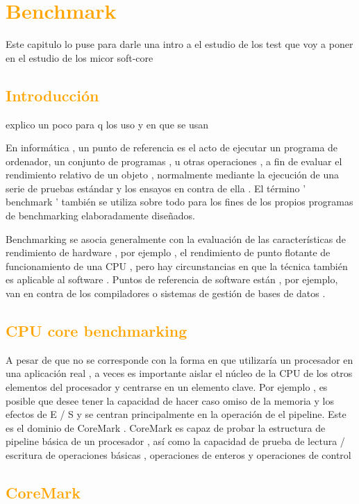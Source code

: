 \documentclass[a4paper,11pt]{article}
\begin{document}
\section{\textcolor{orange}{Benchmark}}
Este capitulo lo puse para darle una intro a el estudio de los test que voy a poner en el estudio de los micor soft-core
	\subsection{\textcolor{orange}{Introducción}}
explico un poco para q los uso y en que se usan

En informática , un punto de referencia es el acto de ejecutar un programa de ordenador, un conjunto de programas , u otras operaciones , a fin de evaluar el rendimiento relativo de un objeto , normalmente mediante la ejecución de una serie de pruebas estándar y los ensayos en contra de ella . El término ' benchmark ' también se utiliza sobre todo para los fines de los propios programas de benchmarking elaboradamente diseñados.

Benchmarking se asocia generalmente con la evaluación de las características de rendimiento de hardware , por ejemplo , el rendimiento de punto flotante de funcionamiento de una CPU , pero hay circunstancias en que la técnica también es aplicable al software . Puntos de referencia de software están , por ejemplo, van en contra de los compiladores o sistemas de gestión de bases de datos .

	\subsection{\textcolor{orange}{CPU core benchmarking}}
 
A pesar de que no se corresponde con la forma en que utilizaría un procesador en una aplicación real , a veces es importante aislar el núcleo de la CPU de los otros elementos del procesador y centrarse en un elemento clave. Por ejemplo , es posible que desee tener la capacidad de hacer caso omiso de la memoria y los efectos de E / S y se centran principalmente en la operación de el pipeline. Este es el dominio de CoreMark . CoreMark es capaz de probar la estructura de pipeline básica de un procesador , así como la capacidad de prueba de lectura / escritura de operaciones básicas , operaciones de enteros y operaciones de control

	\subsection{\textcolor{orange}{CoreMark}}
\end{document}
